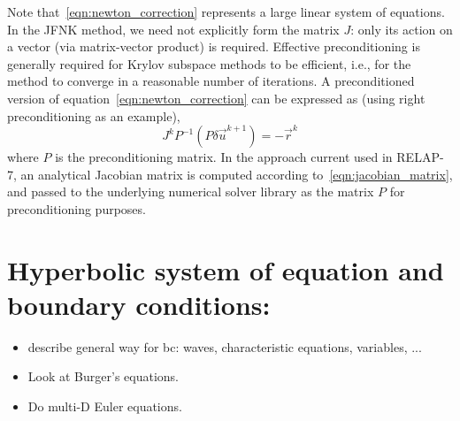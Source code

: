 Note that~\eqref{eqn:newton_correction} represents a large
linear system of equations.  In the JFNK method, we need not
explicitly form the matrix $J$: only its action on a vector
(via matrix-vector product) is required.
Effective preconditioning is generally required for Krylov subspace
methods to be efficient, i.e., for the method to converge in a
reasonable number of iterations. A preconditioned version of
equation~\eqref{eqn:newton_correction} can be expressed as (using
right preconditioning as an example),
\begin{equation}
  \label{eqn:newton_correction_preconditioned}
  J^k P^{-1} \left(P \delta \vec{u}^{k+1} \right)= -\vec{r}^k
\end{equation}
where $P$ is the preconditioning matrix. In the approach current
used in RELAP-7, an analytical Jacobian matrix is computed according
to~\eqref{eqn:jacobian_matrix}, and passed to the underlying numerical solver
library as the matrix $P$ for preconditioning purposes.
\section{Hyperbolic system of equation and boundary conditions:}
\begin{itemize}
\item describe general way for bc: waves, characteristic equations, variables, ...
\item Look at Burger's equations.
\item Do multi-D Euler equations.
\end{itemize}
